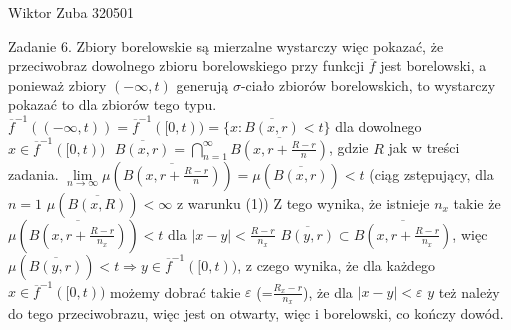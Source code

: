 \documentclass{article}
\begin{document}
Wiktor Zuba 320501
\newline

Zadanie 6.
\newline
\newline
Zbiory borelowskie są mierzalne wystarczy więc pokazać, że przeciwobraz dowolnego zbioru borelowskiego przy funkcji $\overline{f}$ jest borelowski, a ponieważ
zbiory $(-\infty,t)$ generują $\sigma$-ciało zbiorów borelowskich, to wystarczy pokazać to dla zbiorów tego typu.\newline
$\overline{f}^{-1}((-\infty,t))=\overline{f}^{-1}([0,t))=\{x:\overline{B(x,r)}<t\}$\newline
dla dowolnego $x\in\overline{f}^{-1}([0,t))$ $ $ $\overline{B(x,r)}=\bigcap\limits_{n=1}^{\infty}\overline{B(x,r+\frac{R-r}{n})}$, gdzie $R$ jak w treści zadania.\newline
$\lim\limits_{n\rightarrow\infty}\mu(\overline{B(x,r+\frac{R-r}{n})})=\mu(\overline{B(x,r)})<t$ (ciąg zstępujący, dla $n=1$ $\mu(\overline{B(x,R)})<\infty$ z warunku (1))\newline
Z tego wynika, że istnieje $n_x$ takie że $\mu(\overline{B(x,r+\frac{R-r}{n_x})})<t$ dla $|x-y|<\frac{R-r}{n_x}$ $\overline{B(y,r)}\subset\overline{B(x,r+\frac{R-r}{n_x})}$,
więc $\mu(\overline{B(y,r)})<t\Rightarrow y\in\overline{f}^{-1}([0,t))$, z czego wynika, że dla każdego $x\in\overline{f}^{-1}([0,t))$ możemy dobrać takie $\varepsilon$
(=$\frac{R_x-r}{n_x}$), że dla $|x-y|<\varepsilon$ $y$ też należy do tego przeciwobrazu, więc jest on otwarty, więc i borelowski, co kończy dowód.
\end{document}

